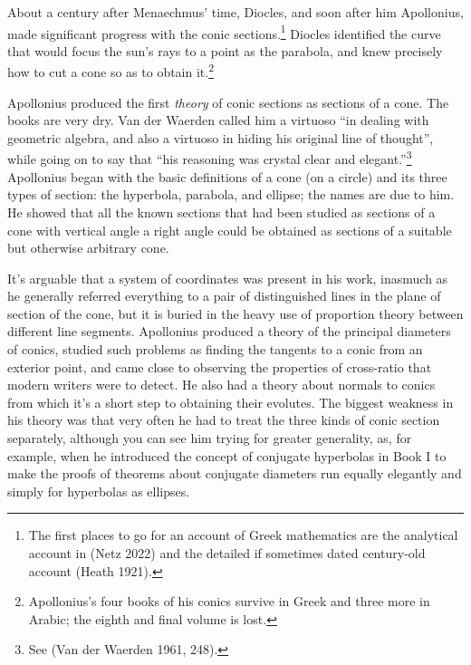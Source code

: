 About a century after Menaechmus' time, Diocles, and soon after him Apollonius, made significant progress with the conic sections.\footnote{The first places to go for an account of Greek mathematics are the analytical account in (Netz 2022) and the detailed if sometimes dated century-old account (Heath 1921).}
Diocles identified the curve that would focus the sun's rays to a point as the parabola, and knew precisely how to cut a cone so as to obtain it.\footnote{Apollonius's four books of his conics survive in Greek and three more in Arabic; the eighth and final volume is lost.} 


Apollonius produced the first \emph{theory} of conic sections as sections of a cone. 
The books are very dry. Van der Waerden called him a virtuoso ``in dealing with geometric algebra, and also a virtuoso in hiding his original line of thought'', while going on to say that ``his reasoning was crystal clear and elegant.''\footnote{See (Van der Waerden 1961, 248).}
Apollonius began with the basic definitions of a cone (on a circle) and its three types of section: the hyperbola, parabola, and ellipse; the names are due to him. He showed that all the known sections that had been studied as sections of a cone with vertical angle a right angle could be obtained as sections of a suitable but otherwise arbitrary cone.

It's  arguable that a system of coordinates was present in his work, inasmuch as he generally referred everything to a pair of distinguished lines in the plane of section of the cone, but it is buried in the heavy use of proportion theory between different line segments. 
Apollonius produced a theory of the principal diameters of conics, studied such problems as finding the tangents to a conic from an exterior point, and came close to observing the properties of cross-ratio that modern writers were to detect. He also had a theory about normals to conics from which  it's a short step to obtaining their evolutes. 
The biggest weakness in his theory was that very often he had to treat the three kinds of conic section separately, although you can see him trying for greater generality, as, for example, when he introduced the concept of conjugate hyperbolas in Book I to make the proofs of theorems about conjugate diameters run equally elegantly and simply for hyperbolas as ellipses.





